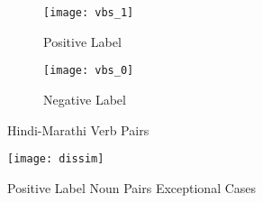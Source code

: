 \begin{figure}[ht]
\centering
\begin{subfigure}{.5\textwidth}
  \centering
  \texttt{[image: vbs\_1]}
  \caption{Positive Label}
\end{subfigure}%
\begin{subfigure}{.5\textwidth}
  \centering
  \texttt{[image: vbs\_0]}
  \caption{Negative Label}
\end{subfigure}
\caption{Hindi-Marathi Verb Pairs}
\end{figure}

\begin{figure}[ht]
\centering
  \texttt{[image: dissim]}
  \caption{Positive Label Noun Pairs Exceptional Cases}
  \label{disssim}
\end{figure}
